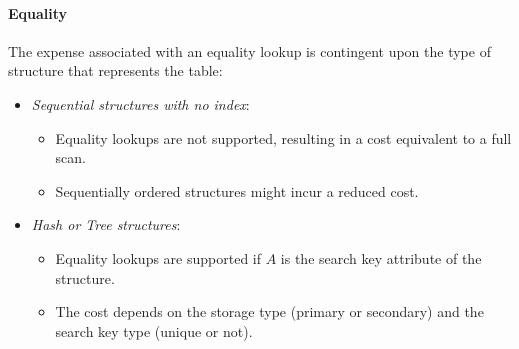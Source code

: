 \paragraph*{Equality}
The expense associated with an equality lookup is contingent upon the type of structure that represents the table:
\begin{itemize}
    \item \textit{Sequential structures with no index}:
        \begin{itemize}
            \item Equality lookups are not supported, resulting in a cost equivalent to a full scan.
            \item Sequentially ordered structures might incur a reduced cost.
        \end{itemize}
    \item \textit{Hash or Tree structures}:
        \begin{itemize}
            \item Equality lookups are supported if $A$ is the search key attribute of the structure.
            \item The cost depends on the storage type (primary or secondary) and the search key type (unique or not).
        \end{itemize}
\end{itemize}

